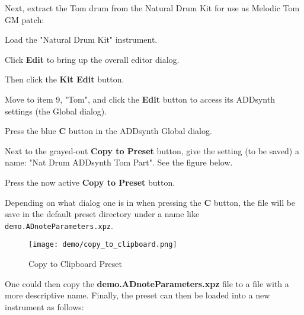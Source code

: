    Next, extract the Tom drum from the Natural Drum Kit for use as Melodic
   Tom GM patch:

      \begin{enumber}
         \item Load the "Natural Drum Kit" instrument.
         \item Click \textbf{Edit} to bring up the overall editor dialog.
         \item Then click the \textbf{Kit Edit} button.
         \item Move to item 9, "Tom", and click the
            \textbf{Edit} button to access its ADDsynth settings (the Global
            dialog).
         \item Press the blue \textbf{C} button in the ADDsynth Global
            dialog.
         \item Next to the grayed-out \textbf{Copy to Preset}
            button, give the setting (to be saved) a name:
            "Nat Drum ADDsynth Tom Part".  See the figure below.
         \item Press the now active \textbf{Copy to Preset} button.
         \item Depending on what dialog one is in when pressing the
            \textbf{C} button, the file will be save in the default preset
            directory under a name like \texttt{demo.ADnoteParameters.xpz}.
      \end{enumber}

\begin{figure}[H]
   \centering 
   \texttt{[image: demo/copy\_to\_clipboard.png]}
   \caption{Copy to Clipboard Preset}
   \label{fig:cookbook_instruments_copy_to_clipboard}
\end{figure}

   One could then copy the \textbf{demo.ADnoteParameters.xpz} file to a file
   with a more descriptive name.
   Finally, the preset can then be loaded into a new instrument as follows:

